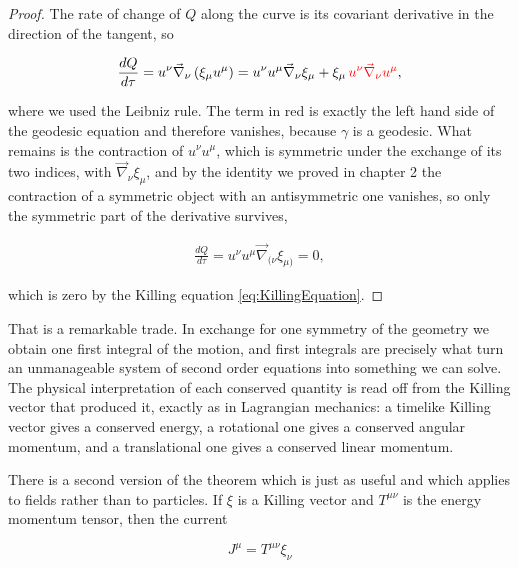        \begin{proof}
            The rate of change of $Q$ along the curve is its covariant derivative in the direction of the tangent, so

            \begin{align*}
                \frac{dQ}{d\tau} = u^{\nu}\Vec{\nabla}_{\nu}\left(\xi_{\mu}u^{\mu}\right) = u^{\nu}u^{\mu}\Vec{\nabla}_{\nu}\xi_{\mu} + \xi_{\mu}\,{\color{red}u^{\nu}\Vec{\nabla}_{\nu}u^{\mu}},
            \end{align*}

            where we used the Leibniz rule. The term in red is exactly the left hand side of the geodesic equation and therefore vanishes, because $\gamma$ is a geodesic. What remains is the contraction of $u^{\nu}u^{\mu}$, which is symmetric under the exchange of its two indices, with $\Vec{\nabla}_{\nu}\xi_{\mu}$, and by the identity we proved in chapter 2 the contraction of a symmetric object with an antisymmetric one vanishes, so only the symmetric part of the derivative survives,

            \begin{align*}
                \frac{dQ}{d\tau} = u^{\nu}u^{\mu}\Vec{\nabla}_{(\nu}\xi_{\mu)} = 0,
            \end{align*}

            which is zero by the Killing equation \ref{eq:KillingEquation}.
        \end{proof}

        That is a remarkable trade. In exchange for one symmetry of the geometry we obtain one first integral of the motion, and first integrals are precisely what turn an unmanageable system of second order equations into something we can solve. The physical interpretation of each conserved quantity is read off from the Killing vector that produced it, exactly as in Lagrangian mechanics: a timelike Killing vector gives a conserved energy, a rotational one gives a conserved angular momentum, and a translational one gives a conserved linear momentum.

        There is a second version of the theorem which is just as useful and which applies to fields rather than to particles. If $\xi$ is a Killing vector and $T^{\mu\nu}$ is the energy momentum tensor, then the current

        \begin{equation}\label{eq:KillingCurrent}
            J^{\mu} = T^{\mu\nu}\xi_{\nu}
        \end{equation}

